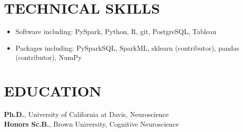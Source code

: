 \documentclass[line,margin,10pt]{res}
\begin{document}
\begin{resume}
 \section{TECHNICAL SKILLS} 
 \begin{itemize}[leftmargin=-2pt] \itemsep -2pt
\item [] Software including: PySpark, Python, R, git, PostgreSQL, Tableau
\item []Packages including: PySparkSQL, SparkML, sklearn (contributor), pandas (contributor), NumPy%
 \end{itemize}
{\vspace{-0.25cm}}

\section{EDUCATION} 
\textbf{Ph.D.}, University of California at Davis, Neuroscience\\
\textbf{Honors Sc.B.}, Brown University, Cognitive Neuroscience%
 
%
%
%
  

\end{resume}
\end{document}
